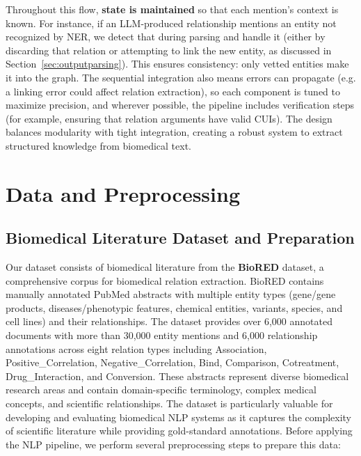 Throughout this flow, \textbf{state is maintained} so that each mention's context is known. For instance, if an LLM-produced relationship mentions an entity not recognized by NER, we detect that during parsing and handle it (either by discarding that relation or attempting to link the new entity, as discussed in Section~\ref{sec:outputparsing}). This ensures consistency: only vetted entities make it into the graph. The sequential integration also means errors can propagate (e.g. a linking error could affect relation extraction), so each component is tuned to maximize precision, and wherever possible, the pipeline includes verification steps (for example, ensuring that relation arguments have valid CUIs). The design balances modularity with tight integration, creating a robust system to extract structured knowledge from biomedical text.

\section{Data and Preprocessing}
\label{sec:datapreprocessing}

\subsection{Biomedical Literature Dataset and Preparation}

Our dataset consists of biomedical literature from the \textbf{BioRED} dataset, a comprehensive corpus for biomedical relation extraction. BioRED contains manually annotated PubMed abstracts with multiple entity types (gene/gene products, diseases/phenotypic features, chemical entities, variants, species, and cell lines) and their relationships. The dataset provides over 6,000 annotated documents with more than 30,000 entity mentions and 6,000 relationship annotations across eight relation types including Association, Positive\_Correlation, Negative\_Correlation, Bind, Comparison, Cotreatment, Drug\_Interaction, and Conversion. These abstracts represent diverse biomedical research areas and contain domain-specific terminology, complex medical concepts, and scientific relationships. The dataset is particularly valuable for developing and evaluating biomedical NLP systems as it captures the complexity of scientific literature while providing gold-standard annotations. Before applying the NLP pipeline, we perform several preprocessing steps to prepare this data:

